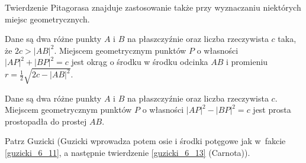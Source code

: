 Twierdzenie Pitagorasa znajduje zastosowanie także przy wyznaczaniu niektórych miejsc geometrycznych.

\begin{proposition}
    Dane są dwa różne punkty $A$ i $B$ na płaszczyźnie oraz liczba rzeczywista $c$ taka, że $2c > |AB|^2$.
    Miejscem geometrycznym punktów $P$ o własności $|AP|^2 + |BP|^2 = c$ jest okrąg o środku w środku odcinka $AB$ i promieniu $r = \frac 1 2 \sqrt{2c - |AB|^2}$.
\end{proposition}

\begin{proposition}
    Dane są dwa różne punkty $A$ i $B$ na płaszczyźnie oraz liczba rzeczywista $c$.
    Miejscem geometrycznym punktów $P$ o własności $|AP|^2 - |BP|^2 = c$ jest prosta prostopadła do prostej $AB$.
\end{proposition}

Patrz Guzicki \cite[s. 170-173]{guzicki_2021} (Guzicki wprowadza potem osie i środki potęgowe jak w~fakcie \ref{guzicki_6_11}, a następnie twierdzenie \ref{guzicki_6_13} (Carnota)).

